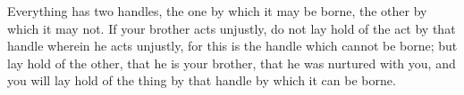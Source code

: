 Everything has  two handles, the  one by  which it may  be borne, the  other by
which it may not. If your brother acts  unjustly, do not lay hold of the act by
that handle wherein  he acts unjustly, for  this is the handle  which cannot be
borne; but lay hold of the other, that he is your brother, that he was nurtured
with you, and you will lay hold of the  thing by that handle by which it can be
borne.
